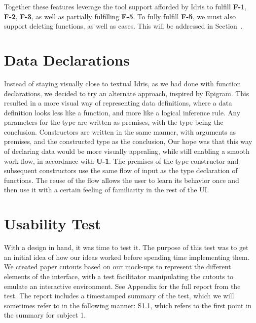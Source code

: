 Together these features leverage the tool support afforded by Idris to fulfill \textbf{F-1}, \textbf{F-2}, \textbf{F-3}, as well as partially fulfilling \textbf{F-5}. To fully fulfill \textbf{F-5}, we must also support deleting functions, as well as cases. This will be addressed in Section~.


\section{Data Declarations}
Instead of staying visually close to textual Idris, as we had done with function declarations, we decided to try an alternate approach, inspired by Epigram.
This resulted in a more visual way of representing data definitions, where a data definition looks less like a function, and more like a logical inference rule.
Any parameters for the type are written as premises, with the type being the conclusion.
Constructors are written in the same manner, with arguments as premises, and the constructed type as the conclusion,
Our hope was that this way of declaring data would be more visually appealing, while still enabling a smooth work flow, in accordance with \textbf{U-1}.
The premises of the type constructor and subsequent constructors use the same flow of input as the type declaration of functions.
The reuse of the flow allows the user to learn its behavior once and then use it with a certain feeling of familiarity in the rest of the UI\@.

\section{Usability Test}
\label{sec:UsabilityTest}
With a design in hand, it was time to test it. The purpose of this test was to
get an initial idea of how our ideas worked before spending time implementing
them. We created paper cutouts based on our mock-ups to represent the different
elements of the interface, with a test facilitator manipulating the cutouts to
emulate an interactive environment. See Appendix  for the full report
from the test. The report includes a timestamped summary of the test, which we
will sometimes refer to in the following manner: S1.1, which refers to the
first point in the summary for subject 1.

